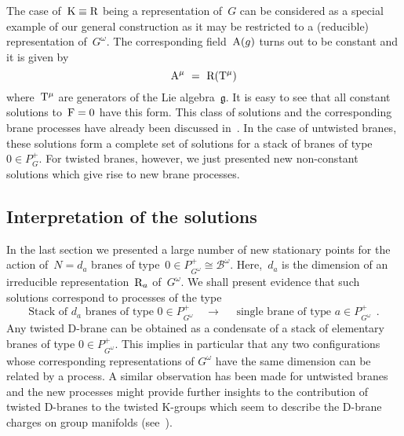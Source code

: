 \documentclass[12pt,a4paper]{article}
\newcommand{\mf}{\mathfrak} %
\newcommand{\mc}{\mathcal} %
\def\iG{G^\omega} %
\def\bL{\mc{B}} %
\def\treps{\bL^\omega} %
\def\tT{{\rm T}} %
\def\tR{{\rm R}} %
\def\tK{{\rm K}} %
\def\tF{{\rm F}}
\def\tA{{\rm A}}
\begin{document}
The case of~$\tK\equiv\tR$ being a representation of~$G$ can be 
considered as a special example of our general construction as 
it may be restricted to a (reducible) representation of~$\iG$. 
The corresponding field~$\tA(g)$ turns out to be constant and 
it is given by 
\begin{equation*}
  \tA^{\mu} \ =\ \tR(\tT^{\mu})
\end{equation*}
where~$\tT^{\mu}$ are generators of the Lie algebra~$\mf{g}$. 
It is easy to see that all constant solutions to~$\tF=0$ have this 
form. This class of solutions and the corresponding brane processes 
have already been discussed in~\cite{Fredenhagen:2000ei}. In the 
case of untwisted branes, these solutions form a complete set of 
solutions for a stack of branes of type~$0\in P_{G}^+$. For twisted 
branes, however, we just presented new non-constant solutions which 
give rise to new brane processes.

\subsection{\label{sc:Interpretation}Interpretation of the solutions}

In the last section we presented a large number of new stationary points 
for the action of~$N=d_a$ branes of type~$0\in P_{\iG}^+\cong\treps$. 
Here,~$d_a$ is the dimension of an irreducible representation~$\tR_a$ 
of~$\iG$. We shall present evidence that such solutions correspond to 
processes of the type
\begin{equation}
  \label{eq:ConjectureDynamic}
  \text{Stack of }d_a\text{ branes of type }0\in P_{\iG}^+
  \quad\longrightarrow\quad\text{ single brane of type }a\in P_{\iG}^+
\ \ . 
\end{equation}
Any twisted D-brane can be obtained as a condensate of a stack of
elementary branes of type $0\in P_{\iG}^+$. This implies in particular 
that any two configurations whose corresponding representations of 
$\iG$ have the same dimension can be related by a process. A similar 
observation has been made for untwisted
branes~\cite{Alekseev:2000fd, Fredenhagen:2000ei} and the new
processes might provide further insights to the contribution 
of twisted D-branes to the twisted K-groups which seem to 
describe the D-brane charges on group manifolds
(see~\cite{Bouwknegt:2000qt,Fredenhagen:2000ei,Maldacena:2001xj}).
\smallskip
\end{document}
